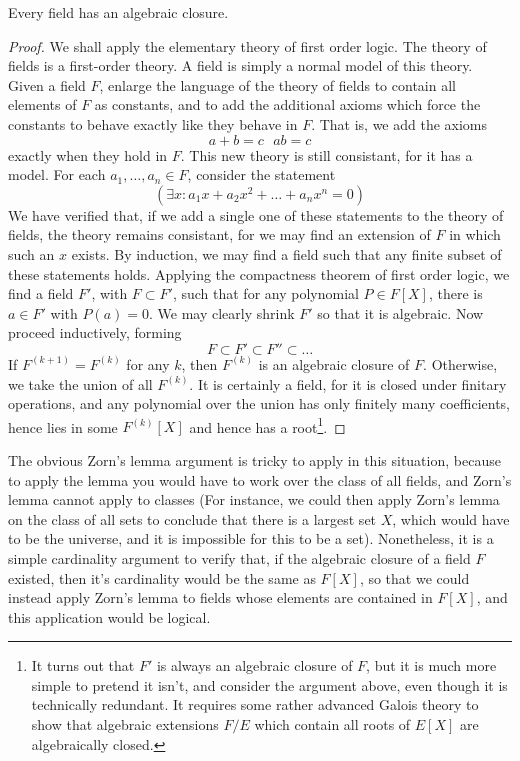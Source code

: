 \begin{theorem}
    Every field has an algebraic closure.
\end{theorem}
\begin{proof}
    We shall apply the elementary theory of first order logic. The theory of fields is a first-order theory. A field is simply a normal model of this theory. Given a field $F$, enlarge the language of the theory of fields to contain all elements of $F$ as constants, and to add the additional axioms which force the constants to behave exactly like they behave in $F$. That is, we add the axioms
    \[ a + b = c\ \ \ ab = c \]
    exactly when they hold in $F$. This new theory is still consistant, for it has a model. For each $a_1, \dots, a_n \in F$, consider the statement
    \[ (\exists x: a_1 x + a_2 x^2 + \dots + a_n x^n = 0) \]
    We have verified that, if we add a single one of these statements to the theory of fields, the theory remains consistant, for we may find an extension of $F$ in which such an $x$ exists. By induction, we may find a field such that any finite subset of these statements holds. Applying the compactness theorem of first order logic, we find a field $F'$, with $F \subset F'$, such that for any polynomial $P \in F[X]$, there is $a \in F'$ with $P(a) = 0$. We may clearly shrink $F'$ so that it is algebraic. Now proceed inductively, forming
    \[ F \subset F' \subset F'' \subset \dots \]
    If $F^{(k+1)} = F^{(k)}$ for any $k$, then $F^{(k)}$ is an algebraic closure of $F$. Otherwise, we take the union of all $F^{(k)}$. It is certainly a field, for it is closed under finitary operations, and any polynomial over the union has only finitely many coefficients, hence lies in some $F^{(k)}[X]$ and hence has a root\footnote{It turns out that $F'$ is always an algebraic closure of $F$, but it is much more simple to pretend it isn't, and consider the argument above, even though it is technically redundant. It requires some rather advanced Galois theory to show that algebraic extensions $F/E$ which contain all roots of $E[X]$ are algebraically closed.}.
\end{proof}

The obvious Zorn's lemma argument is tricky to apply in this situation, because to apply the lemma you would have to work over the class of all fields, and Zorn's lemma cannot apply to classes (For instance, we could then apply Zorn's lemma on the class of all sets to conclude that there is a largest set $X$, which would have to be the universe, and it is impossible for this to be a set). Nonetheless, it is a simple cardinality argument to verify that, if the algebraic closure of a field $F$ existed, then it's cardinality would be the same as $F[X]$, so that we could instead apply Zorn's lemma to fields whose elements are contained in $F[X]$, and this application would be logical.

